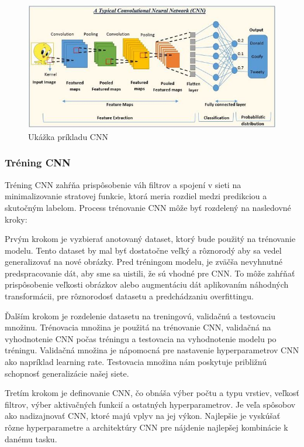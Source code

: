 \begin{figure}
\includegraphics{images/CNN.resized.JPG}
\caption{Ukážka príkladu CNN}
\label{fig:image}
\end{figure}

\subsubsection{Tréning CNN}
\hspace{\parindent}Tréning CNN zahŕňa prispôsobenie váh filtrov a spojení v sieti na minimalizovanie stratovej funkcie, ktorá meria rozdiel medzi predikciou a skutočným labelom. Process trénovanie CNN môže byť rozdelený na nasledovné kroky:

Prvým krokom je vyzbierať anotovaný dataset, ktorý bude použitý na trénovanie modelu. Tento dataset by mal byť dostatočne veľký a rôznorodý aby sa vedel generalizovať na nové obrázky. Pred tréningom modelu, je zväčša nevyhnutné predspracovanie dát, aby sme sa uistili, že sú vhodné pre CNN. To môže zahŕňať prispôsobenie veľkosti obrázkov alebo augmentáciu dát aplikovaním náhodných transformácii, pre rôznorodosť datasetu a predchádzaniu overfittingu. 

Ďalším krokom je rozdelenie datasetu na treningovú, validačnú a testovaciu množinu. Trénovacia množina je použitá na trénovanie CNN, validačná na vyhodnotenie CNN počas tréningu a testovacia na vyhodnotenie modelu po tréningu. Validačná množina je nápomocná pre nastavenie hyperparametrov CNN ako napríklad learning rate. Testovacia množina nám poskytuje približnú schopnosť generalizácie našej siete. 

Tretím krokom je definovanie CNN, čo obnáša výber počtu a typu vrstiev, veľkosť filtrov, výber aktivačných funkcií a ostatných hyperparametrov. Je veľa spôsobov ako nadizajnovať CNN, ktoré majú vplyv na jej výkon. Najlepšie je vyskúšať rôzne hyperparametre a architektúry CNN pre nájdenie najlepšej kombinácie k danému tasku. 

